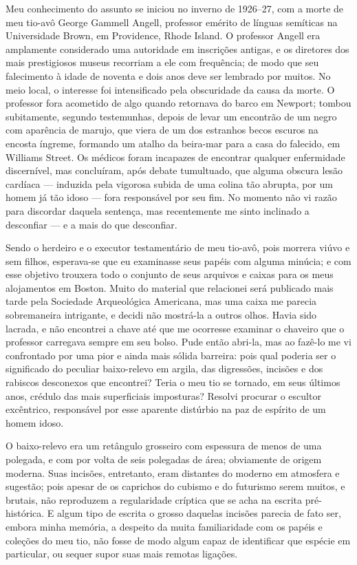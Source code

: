 \begin{Rightside}
Meu conhecimento do assunto se iniciou no inverno de 1926--27, com a
morte de meu tio-avô George Gammell Angell, professor emérito de línguas
semíticas na Universidade Brown, em Providence, Rhode Island. O
professor Angell era amplamente considerado uma autoridade em inscrições
antigas, e os diretores dos mais prestigiosos museus recorriam a ele com
frequência; de modo que seu falecimento à idade de noventa e dois anos
deve ser lembrado por muitos. No meio local, o interesse foi
intensificado pela obscuridade da causa da morte. O professor fora
acometido de algo quando retornava do barco em Newport; tombou
subitamente, segundo testemunhas, depois de levar um encontrão de um
negro com aparência de marujo, que viera de um dos estranhos becos
escuros na encosta íngreme, formando um atalho da beira-mar para a casa
do falecido, em Williams Street. Os médicos foram incapazes de encontrar
qualquer enfermidade discernível, mas concluíram, após debate
tumultuado, que alguma obscura lesão cardíaca --- induzida pela vigorosa
subida de uma colina tão abrupta, por um homem já tão idoso --- fora
responsável por seu fim. No momento não vi razão para discordar daquela
sentença, mas recentemente me sinto inclinado a desconfiar --- e a mais 
do que desconfiar. 


Sendo o herdeiro e o executor testamentário de meu tio-avô, pois morrera
viúvo e sem filhos, esperava-se que eu examinasse seus papéis com alguma
minúcia; e com esse objetivo trouxera todo o conjunto de seus arquivos e
caixas para os meus alojamentos em Boston. Muito do material que
relacionei será publicado mais tarde pela Sociedade Arqueológica
Americana, mas uma caixa me parecia sobremaneira intrigante, e decidi
não mostrá-la a outros olhos. Havia sido lacrada, e não encontrei a
chave até que me ocorresse examinar o chaveiro que o professor carregava
sempre em seu bolso. Pude então abri-la, mas ao fazê-lo me vi
confrontado por uma pior e ainda mais sólida barreira: pois qual poderia
ser o significado do peculiar baixo-relevo em argila, das digressões,
incisões e dos rabiscos desconexos que encontrei? Teria o meu tio se
tornado, em seus últimos anos, crédulo das mais superficiais imposturas?
Resolvi procurar o escultor excêntrico, responsável por esse aparente
distúrbio na paz de espírito de um homem idoso.

O baixo-relevo era um retângulo grosseiro com espessura de menos de uma
polegada, e com por volta de seis polegadas de área; obviamente de
origem moderna. Suas incisões, entretanto, eram distantes do moderno em
atmosfera e sugestão; pois apesar de os caprichos do cubismo e do
futurismo serem muitos, e brutais, não reproduzem a regularidade
críptica que se acha na escrita pré-histórica. E algum tipo de escrita o
grosso daquelas incisões parecia de fato ser, embora minha memória, a
despeito da muita familiaridade com os papéis e coleções do meu tio, não
fosse de modo algum capaz de identificar que espécie em particular, ou
sequer supor suas mais remotas ligações.


\end{Rightside}
